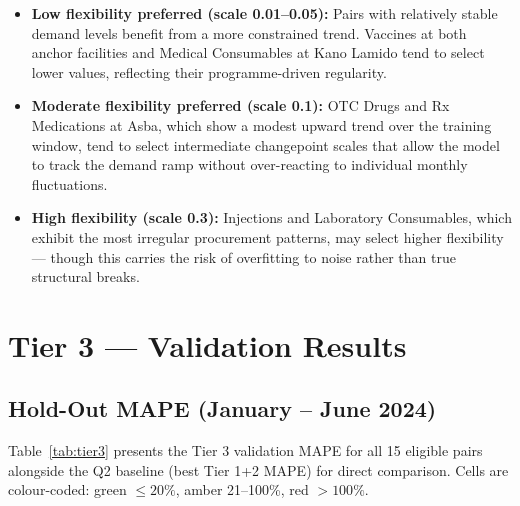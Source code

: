 \documentclass[12pt, a4paper]{article}
\begin{document}
\begin{itemize}[leftmargin=1.5em, itemsep=4pt]
  \item \textbf{Low flexibility preferred (scale 0.01--0.05):} Pairs with
        relatively stable demand levels benefit from a more constrained
        trend. Vaccines at both anchor facilities and Medical Consumables
        at Kano Lamido tend to select lower values, reflecting their
        programme-driven regularity.

  \item \textbf{Moderate flexibility preferred (scale 0.1):}
        OTC Drugs and Rx Medications at Asba, which show a modest upward
        trend over the training window, tend to select intermediate
        changepoint scales that allow the model to track the demand ramp
        without over-reacting to individual monthly fluctuations.

  \item \textbf{High flexibility (scale 0.3):} Injections and
        Laboratory Consumables, which exhibit the most irregular
        procurement patterns, may select higher flexibility --- though
        this carries the risk of overfitting to noise rather than
        true structural breaks.
\end{itemize}

\section{Tier 3 --- Validation Results}

\subsection{Hold-Out MAPE (January -- June 2024)}

Table~\ref{tab:tier3} presents the Tier 3 validation MAPE for all
15 eligible pairs alongside the Q2 baseline (best Tier 1+2 MAPE)
for direct comparison. Cells are colour-coded:
\colorbox{mapeGreen}{green} $\leq 20\%$,
\colorbox{mapeAmber}{amber} 21--100\%, red $> 100\%$.

\vspace{0.6em}
\end{document}
